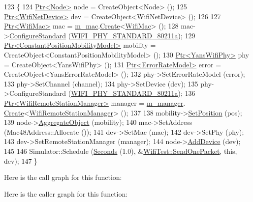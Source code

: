 \begin{DoxyCode}
123 \{
124   \hyperlink{classns3_1_1Ptr}{Ptr<Node>} node = CreateObject<Node> ();
125   \hyperlink{classns3_1_1Ptr}{Ptr<WifiNetDevice>} dev = CreateObject<WifiNetDevice> ();
126 
127   \hyperlink{classns3_1_1Ptr}{Ptr<WifiMac>} mac = \hyperlink{classWifiTest_a45a5cd8ad4b8ca5e785db91c9fc1c20a}{m\_mac}.\hyperlink{classns3_1_1ObjectFactory_a18152e93f0a6fe184ed7300cb31e9896}{Create}<\hyperlink{classns3_1_1WifiMac}{WifiMac}> ();
128   mac->\hyperlink{classns3_1_1WifiMac_a16ec5352c804df83e42159ab4e2e73d8}{ConfigureStandard} (\hyperlink{group__wifi_gga1299834f4e1c615af3ca738033b76a49a22db1e8022db2c3450414b86c77b11e4}{WIFI\_PHY\_STANDARD\_80211a});
129   \hyperlink{classns3_1_1Ptr}{Ptr<ConstantPositionMobilityModel>} mobility = 
      CreateObject<ConstantPositionMobilityModel> ();
130   \hyperlink{classns3_1_1Ptr}{Ptr<YansWifiPhy>} phy = CreateObject<YansWifiPhy> ();
131   \hyperlink{classns3_1_1Ptr}{Ptr<ErrorRateModel>} error = CreateObject<YansErrorRateModel> ();
132   phy->SetErrorRateModel (error);
133   phy->SetChannel (channel);
134   phy->SetDevice (dev);
135   phy->ConfigureStandard (\hyperlink{group__wifi_gga1299834f4e1c615af3ca738033b76a49a22db1e8022db2c3450414b86c77b11e4}{WIFI\_PHY\_STANDARD\_80211a});
136   \hyperlink{classns3_1_1Ptr}{Ptr<WifiRemoteStationManager>} manager = \hyperlink{classWifiTest_aba977fcd0815e799f16e769c615dfd8e}{m\_manager}.
      \hyperlink{classns3_1_1ObjectFactory_a18152e93f0a6fe184ed7300cb31e9896}{Create}<\hyperlink{classns3_1_1WifiRemoteStationManager}{WifiRemoteStationManager}> ();
137 
138   mobility->\hyperlink{classns3_1_1MobilityModel_ac584b3d5a309709d2f13ed6ada1e7640}{SetPosition} (pos);
139   node->\hyperlink{classns3_1_1Object_a79dd435d300f3deca814553f561a2922}{AggregateObject} (mobility);
140   mac->SetAddress (Mac48Address::Allocate ());
141   dev->SetMac (mac);
142   dev->SetPhy (phy);
143   dev->SetRemoteStationManager (manager);
144   node->\hyperlink{classns3_1_1Node_a42ff83ee1d5d1649c770d3f5b62375de}{AddDevice} (dev);
145 
146   Simulator::Schedule (\hyperlink{group__timecivil_ga33c34b816f8ff6628e33d5c8e9713b9e}{Seconds} (1.0), &\hyperlink{classWifiTest_ab8396decc55a92bc2fe63e02350812a1}{WifiTest::SendOnePacket}, \textcolor{keyword}{this}, dev);
147 \}
\end{DoxyCode}


Here is the call graph for this function\+:




Here is the caller graph for this function\+:


